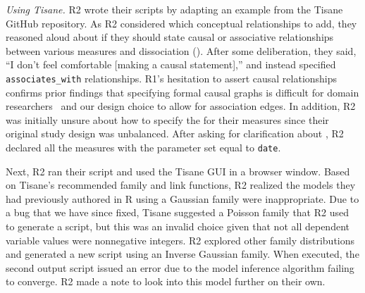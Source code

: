 \textit{Using Tisane.} %
R2 wrote their scripts by adapting an
example from the Tisane GitHub repository.
As R2 considered which conceptual relationships to add, they reasoned aloud about
if they should state causal or associative relationships between various measures and dissociation (\rqCognitive). %
After some
deliberation, they said, ``I don't feel comfortable [making a causal
statement],'' and instead specified \texttt{associates\_with} relationships.
R1's hesitation to assert causal relationships confirms prior findings that
specifying formal causal graphs is difficult for domain
researchers~\cite{suzuki2020causal,suzuki2018mechanisms,velentgas2013developing} and our design choice
to allow for association edges.
In addition, R2 was initially unsure about how to specify the
\numberofinstances for their measures since their original study design
was unbalanced. %
After asking for clarification about \numberofinstances,
R2 declared all the measures with the parameter
\numberofinstances set equal to \texttt{date}.

Next, R2 ran their script %
and used the Tisane GUI in a browser window. Based on Tisane's recommended
family and link functions, R2 realized the models they had previously authored
in R using a Gaussian family were inappropriate. Due to a bug that we have since
fixed, Tisane suggested a Poisson family that R2 used to generate a script, but
this was an invalid choice given that not all dependent variable values were
nonnegative integers. R2 explored other family distributions and generated a new
script using an Inverse Gaussian family. When executed, the second output script
issued an error due to the model inference algorithm failing to converge.
R2 made a note to look into this model further on their own.


